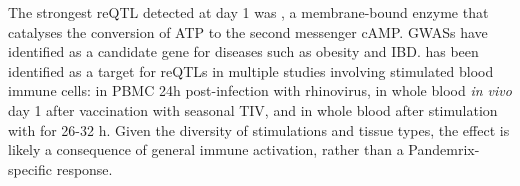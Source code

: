 The strongest \gls{reQTL} detected at day 1 was , a membrane-bound enzyme that catalyses the conversion of ATP to the second messenger cAMP\autocite{wu2016AdenylateCyclaseNew}.
\Glspl{GWAS} have identified  as a candidate gene for diseases such as obesity\autocite{wu2016AdenylateCyclaseNew} and IBD\autocite{mcgovern2015GeneticsInflammatoryBowel}.
%
 has been identified as a target for reQTLs in multiple studies involving stimulated blood immune cells:
in \gls{PBMC} 24h post-infection with rhinovirus\autocite{caliskan2015HostGeneticVariation},
in whole blood \textit{in vivo} day 1 after vaccination with seasonal \gls{TIV}\autocite{franco2013IntegrativeGenomicAnalysis},
and in whole blood after stimulation with  for 26-32 h\autocite{manry2017DecipheringGeneticControl}.
Given the diversity of stimulations and tissue types, the effect is likely a consequence of general immune activation, rather than a Pandemrix-specific response.

